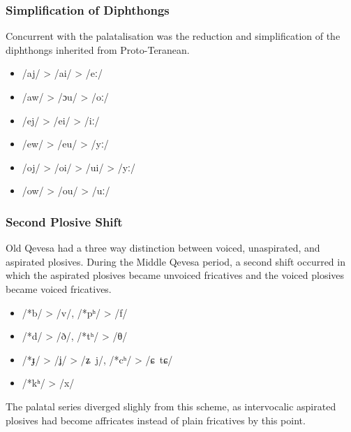 \documentclass[grammar]{subfiles}
\begin{document}
%



\subsubsection{Simplification of Diphthongs}
\label{sssec:history:east:diphthong_simplification}

Concurrent with the palatalisation was the reduction and simplification of the
diphthongs inherited from Proto-Teranean. 

\begin{itemize}
  \item /aj/ > /ai/ > /eː/
  \item /aw/ > /ɔu/ > /oː/
  \item /ej/ > /ei/ > /iː/
  \item /ew/ > /eu/ > /yː/
  \item /oj/ > /oi/ > /ui/ > /yː/
  \item /ow/ > /ou/ > /uː/
\end{itemize}

\subsubsection{Second Plosive Shift}
\label{sssec:history:east:second_plosive_shift}

Old Qevesa had a three way distinction between voiced, unaspirated, and
aspirated plosives.  During the Middle Qevesa period, a second shift occurred
in which the aspirated plosives became unvoiced fricatives and the voiced
plosives became voiced fricatives.  

\begin{itemize}
  \item /*b/ > /v/, /*pʰ/ > /f/
  \item /*d/ > /ð/, /*tʰ/ > /θ/
  \item /*ɟ/ > /ʝ/ > /ʑ~j/, /*cʰ/ > /ɕ~tɕ/
  \item /*kʰ/ > /x/
\end{itemize}

The palatal series diverged slighly from this scheme, as intervocalic aspirated
plosives had become affricates instead of plain fricatives by this point.

\end{document}
